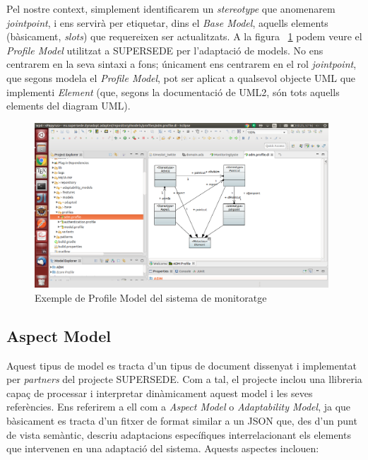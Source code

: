 Pel nostre context, simplement identificarem un \textit{stereotype} que anomenarem \textit{jointpoint}, i ens servirà per etiquetar, dins el \textit{Base Model}, aquells elements (bàsicament, \textit{slots}) que requereixen ser actualitzats. A la figura ~\ref{fig:profile} podem veure el \textit{Profile Model} utilitzat a SUPERSEDE per l'adaptació de models. No ens centrarem en la seva sintaxi a fons; únicament ens centrarem en el rol \textit{jointpoint}, que segons modela el \textit{Profile Model}, pot ser aplicat a qualsevol objecte UML que implementi \textit{Element} (que, segons la documentació de UML2, són tots aquells elements del diagram UML).\\

\begin{figure}
\centering
\includegraphics[width=11cm]{Figures/profile}
\decoRule
\caption{Exemple de Profile Model del sistema de monitoratge}
\label{fig:profile}
\end{figure}

\subsection{Aspect Model}

Aquest tipus de model es tracta d'un tipus de document dissenyat i implementat per \textit{partners} del projecte SUPERSEDE. Com a tal, el projecte inclou una llibreria capaç de processar i interpretar dinàmicament aquest model i les seves referències. Ens referirem a ell com a \textit{Aspect Model} o \textit{Adaptability Model}, ja que bàsicament es tracta d'un fitxer de format similar a un JSON que, des d'un punt de vista semàntic, descriu adaptacions específiques interrelacionant els elements que intervenen en una adaptació del sistema. Aquests aspectes inclouen:

